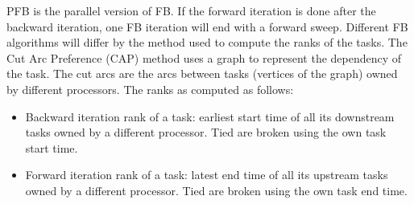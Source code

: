 \documentclass[letterpaper]{article}
\renewcommand{\(}{\left(}
\renewcommand{\)}{\right)}
\renewcommand{\[}{\left[}
\renewcommand{\]}{\right]}
\begin{document}
PFB is the parallel version of FB. If the forward iteration is done after the
backward iteration, one
FB iteration will end with a forward sweep. Different FB
algorithms will differ by the method used to compute the ranks of the tasks. The
Cut Arc Preference (CAP) method uses a graph to represent the dependency of the
task. The cut arcs are the arcs between tasks (vertices of the
graph) owned by different processors. The ranks as computed as follows:
\begin{itemize}
  \item Backward iteration rank of a task: earliest start time of all its downstream tasks
    owned by a different processor. Tied are broken using the own task start time.
  \item Forward iteration rank of a task: latest end time of all its upstream tasks owned
    by a different processor. Tied are broken using the own task end time.
\end{itemize}
\end{document}
